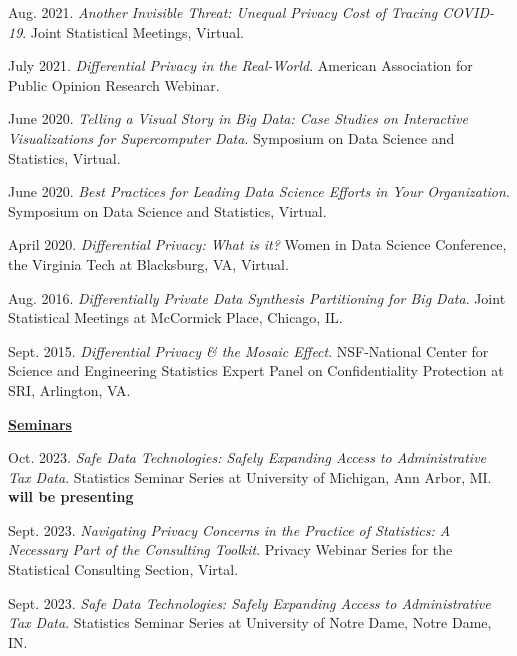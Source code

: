 \begin{etaremune}[topsep=0pt, itemsep=4pt, partopsep=0pt, parsep=0pt]
    \item Aug. 2021. \textit{Another Invisible Threat: Unequal Privacy Cost of Tracing COVID-19}. Joint Statistical Meetings, Virtual.
    
    \item July 2021. \textit{Differential Privacy in the Real-World}. American Association for Public Opinion Research Webinar.

    \item June 2020. \textit{Telling a Visual Story in Big Data: Case Studies on Interactive Visualizations for Supercomputer Data}. Symposium on Data Science and Statistics, Virtual.
  
    \item June 2020. \textit{Best Practices for Leading Data Science Efforts in Your Organization}. Symposium on Data Science and Statistics, Virtual.
  
    \item April 2020. \textit{Differential Privacy: What is it?} Women in Data Science Conference, the Virginia Tech at Blacksburg, VA, Virtual.

    \item Aug. 2016. \textit{Differentially Private Data Synthesis Partitioning for Big Data}. Joint Statistical Meetings at McCormick Place, Chicago, IL.
    
    \item Sept. 2015. \textit{Differential Privacy \& the Mosaic Effect}. NSF-National Center for Science and Engineering Statistics Expert Panel on Confidentiality Protection at SRI, Arlington, VA.

\vspace{6pt}
\hspace{-0.30in}\underline{\textbf{\large Seminars}}\normalsize
    \item Oct. 2023. \textit{Safe Data Technologies: Safely Expanding Access to Administrative Tax Data}. Statistics Seminar Series at University of Michigan, Ann Arbor, MI. \textbf{will be presenting}

    \item Sept. 2023. \textit{Navigating Privacy Concerns in the Practice of Statistics: A Necessary Part of the Consulting Toolkit}. Privacy Webinar Series for the Statistical Consulting Section, Virtal.    
    
    \item Sept. 2023. \textit{Safe Data Technologies: Safely Expanding Access to Administrative Tax Data}. Statistics Seminar Series at University of Notre Dame, Notre Dame, IN.
    

\end{etaremune}
